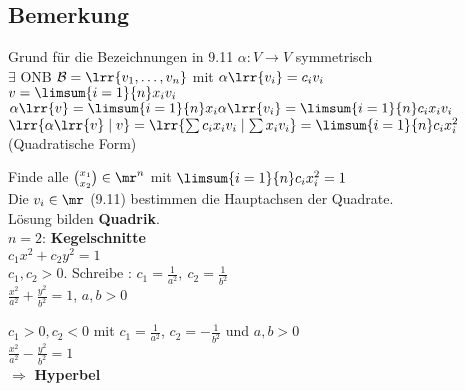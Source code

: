 \subsection{Bemerkung}
	Grund für die Bezeichnungen in 9.11 $\alpha:V\rightarrow V$ symmetrisch\\
	$\exists$ ONB $\mathcal{B}=\lrr{v_1,\dots,v_n}$ mit $\alpha\lrr{v_i}=c_iv_i$\\
	$v=\limsum{i=1}{n} x_iv_i$\\
	$\alpha\lrr{v}=\limsum{i=1}{n} x_i\alpha\lrr{v_i}=\limsum{i=1}{n} c_ix_iv_i$\\
	$\lrr{\alpha\lrr{v}\mid v}=\lrr{\sum c_ix_iv_i\mid\sum x_iv_i}=\limsum{i=1}{n} c_ix_i^2$ (Quadratische Form)

	Finde alle $ \binom{x_1} {x_2}\in\mr^n $ mit $ \limsum{i=1}{n}c_ix_i^2=1 $\\
	Die $ v_i\in\mr $ (9.11) bestimmen die Hauptachsen der Quadrate.\\
	Lösung bilden \textbf{Quadrik}.\\
	$ n=2 $: \textbf{Kegelschnitte}\\
	$ c_1x^2+c_2y^2=1 $\\
	$c_1,c_2>0$. Schreibe : $ c_1=\frac{1}{a^2},\ c_2=\frac{1}{b^2} $\\
	$ \frac{x^2}{a^2}+\frac{y^2}{b^2}=1 $, $ a,b>0 $

	$c_1>0, c_2<0$ mit $c_1=\frac{1}{a^2}$, $c_2=-\frac{1}{b^2}$ und $a,b>0$\\
	$\frac{x^2}{a^2}-\frac{y^2}{b^2}=1$\\
	$\Rightarrow$ \textbf{Hyperbel}
